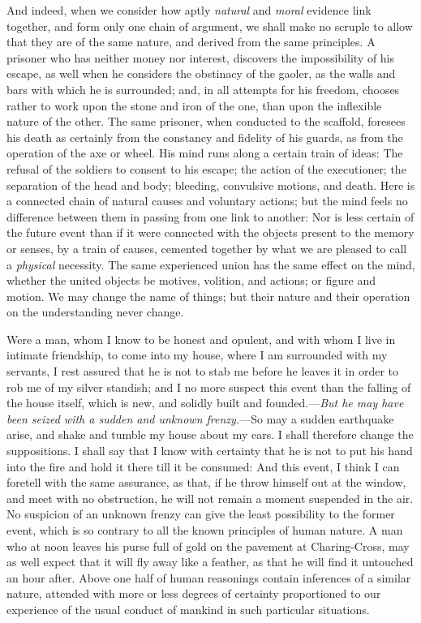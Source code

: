\documentclass[]{article}
\begin{document}
\begin{sectionbody}
\humeparagraph  And indeed, when we consider how aptly \emph{natural} and \emph{moral} evidence link together, and form only one chain of argument, we shall make no scruple to allow that they are of the same nature, and derived from the same principles. A prisoner who has neither money nor interest, discovers the impossibility of his escape, as well when he considers the obstinacy of the gaoler, as the walls and bars with which he is surrounded; and, in all attempts for his freedom, chooses rather to work upon the stone and iron of the one, than upon the inflexible nature of the other. The same prisoner, when conducted to the scaffold, foresees his death as certainly from the constancy and fidelity of his guards, as from the operation of the axe or wheel. His mind runs along a certain train of ideas: The refusal of the soldiers to consent to his escape; the action of the executioner; the separation of the head and body; bleeding, convulsive motions, and death. Here is a connected chain of natural causes and voluntary actions; but the mind feels no difference between them in passing from one link to another: Nor is less certain of the future event than if it were connected with the objects present to the memory or senses, by a train of causes, cemented together by what we are pleased to call a \emph{physical} necessity. The same experienced union has the same effect on the mind, whether the united objects be motives, volition, and actions; or figure and motion. We may change the name of things; but their nature and their operation on the understanding never change.

\humeparagraph  Were a man, whom I know to be honest and opulent, and with whom I live in intimate friendship, to come into my house, where I am surrounded with my servants, I rest assured that he is not to stab me before he leaves it in order to rob me of my silver standish; and I no more suspect this event than the falling of the house itself, which is new, and solidly built and founded.---\emph{But he may have been seized with a sudden and unknown frenzy.}---So may a sudden earthquake arise, and shake and tumble my house about my ears. I shall therefore change the suppositions. I shall say that I know with certainty that he is not to put his hand into the fire and hold it there till it be consumed: And this event, I think I can foretell with the same assurance, as that, if he throw himself out at the window, and meet with no obstruction, he will not remain a moment suspended in the air. No suspicion of an unknown frenzy can give the least possibility to the former event, which is so contrary to all the known principles of human nature. A man who at noon leaves his purse full of gold on the pavement at Charing-Cross, may as well expect that it will fly away like a feather, as that he will find it untouched an hour after. Above one half of human reasonings contain inferences of a similar nature, attended with more or less degrees of certainty proportioned to our experience of the usual conduct of mankind in such particular situations.


\end{sectionbody}
\end{document}
